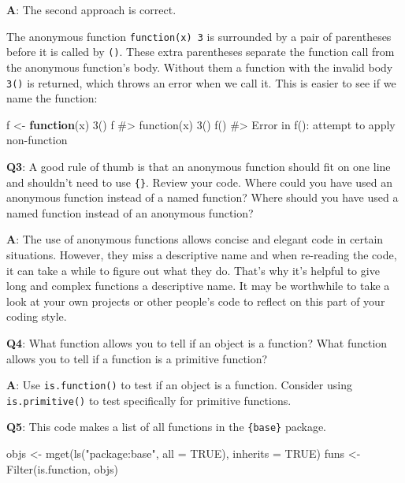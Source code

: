 \documentclass[
]{krantz}
\makeatletter
\newenvironment{Shaded}{\begin{snugshade}}{\end{snugshade}}
\newcommand{\CommentTok}[1]{\textcolor[rgb]{0.56,0.35,0.01}{\textit{#1}}}
\newcommand{\ControlFlowTok}[1]{\textcolor[rgb]{0.13,0.29,0.53}{\textbf{#1}}}
\newcommand{\DataTypeTok}[1]{\textcolor[rgb]{0.13,0.29,0.53}{#1}}
\newcommand{\DecValTok}[1]{\textcolor[rgb]{0.00,0.00,0.81}{#1}}
\newcommand{\KeywordTok}[1]{\textcolor[rgb]{0.13,0.29,0.53}{\textbf{#1}}}
\newcommand{\NormalTok}[1]{#1}
\newcommand{\OtherTok}[1]{\textcolor[rgb]{0.56,0.35,0.01}{#1}}
\newcommand{\StringTok}[1]{\textcolor[rgb]{0.31,0.60,0.02}{#1}}
\newenvironment{kframe}{%
\medskip{}
\setlength{\fboxsep}{.8em}
 \def\at@end@of@kframe{}%
 \ifinner\ifhmode%
  \def\at@end@of@kframe{\end{minipage}}%
  \begin{minipage}{\columnwidth}%
 \fi\fi%
 \def\FrameCommand##1{\hskip\@totalleftmargin \hskip-\fboxsep
 \colorbox{shadecolor}{##1}\hskip-\fboxsep
     \hskip-\linewidth \hskip-\@totalleftmargin \hskip\columnwidth}%
 \MakeFramed {\advance\hsize-\width
   \@totalleftmargin\z@ \linewidth\hsize
   \@setminipage}}%
 {\par\unskip\endMakeFramed%
 \at@end@of@kframe}
\renewenvironment{Shaded}{\begin{kframe}}{\end{kframe}}
\renewcommand{\KeywordTok} [1]{\textcolor[rgb]{0.00,0.44,0.13}{{#1}}}
\renewcommand{\DataTypeTok}[1]{\textcolor[rgb]{0.56,0.13,0.00}{{#1}}}
\renewcommand{\DecValTok}  [1]{\textcolor[rgb]{0.25,0.63,0.44}{{#1}}}
\renewcommand{\StringTok}  [1]{\textcolor[rgb]{0.25,0.44,0.63}{{#1}}}
\renewcommand{\CommentTok} [1]{\textcolor[rgb]{0.38,0.63,0.69}{{#1}}}
\renewcommand{\OtherTok}   [1]{\textcolor[rgb]{0.00,0.44,0.13}{{#1}}}
\renewcommand{\NormalTok}  [1]{{#1}}
\makeatother
\begin{document}
\textbf{{A}}: The second approach is correct.

The anonymous function \texttt{function(x)\ 3} is surrounded by a pair of parentheses before it is called by \texttt{()}. These extra parentheses separate the function call from the anonymous function's body. Without them a function with the invalid body \texttt{3()} is returned, which throws an error when we call it. This is easier to see if we name the function:

\begin{Shaded}
\begin{Highlighting}[]
\NormalTok{f <-}\StringTok{ }\ControlFlowTok{function}\NormalTok{(x) }\DecValTok{3}\NormalTok{()}
\NormalTok{f}
\CommentTok{#> function(x) 3()}
\KeywordTok{f}\NormalTok{()}
\CommentTok{#> Error in f(): attempt to apply non-function}
\end{Highlighting}
\end{Shaded}

\textbf{{Q3}}: A good rule of thumb is that an anonymous function should fit on one line and shouldn't need to use \texttt{\{\}}. Review your code. Where could you have used an anonymous function instead of a named function? Where should you have used a named function instead of an anonymous function?

\textbf{{A}}: The use of anonymous functions allows concise and elegant code in certain situations. However, they miss a descriptive name and when re-reading the code, it can take a while to figure out what they do. That's why it's helpful to give long and complex functions a descriptive name. It may be worthwhile to take a look at your own projects or other people's code to reflect on this part of your coding style.

\textbf{{Q4}}: What function allows you to tell if an object is a function? What function allows you to tell if a function is a primitive function?

\textbf{{A}}: Use \texttt{is.function()} to test if an object is a function. Consider using \texttt{is.primitive()} to test specifically for primitive functions.

\textbf{{Q5}}: This code makes a list of all functions in the \texttt{\{base\}} package.

\begin{Shaded}
\begin{Highlighting}[]
\NormalTok{objs <-}\StringTok{ }\KeywordTok{mget}\NormalTok{(}\KeywordTok{ls}\NormalTok{(}\StringTok{"package:base"}\NormalTok{, }\DataTypeTok{all =} \OtherTok{TRUE}\NormalTok{), }\DataTypeTok{inherits =} \OtherTok{TRUE}\NormalTok{)}
\NormalTok{funs <-}\StringTok{ }\KeywordTok{Filter}\NormalTok{(is.function, objs)}
\end{Highlighting}
\end{Shaded}
\end{document}
